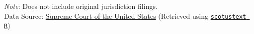 \centering
\footnotesize{\emph{Note}: Does not include original jurisdiction filings.} \\
\footnotesize{Data Source: \href{https://www.supremecourt.gov/docket/docket.aspx}{Supreme Court of the United States} (Retrieved using \href{https://jaketruscott.github.io/scotustext/}{\texttt{scotustext R}})}

